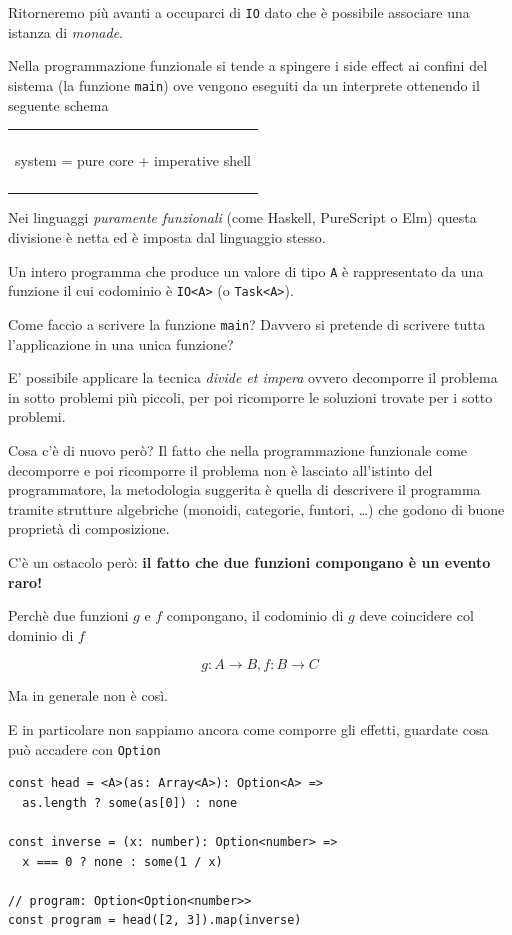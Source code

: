 \documentclass[12pt]{article}
\newenvironment{demo}
    {\begin{center}
    \begin{tabular}{|p{0.9\textwidth}|}
    \hline\\
    }
    {
    \\\\\hline
    \end{tabular}
    \end{center}
    }
\begin{document}
Ritorneremo più avanti a occuparci di \texttt{IO} dato che è possibile associare una istanza di \emph{monade}.

Nella programmazione funzionale si tende a spingere i side effect ai confini del sistema (la funzione \texttt{main})
ove vengono eseguiti da un interprete ottenendo il seguente schema

\begin{demo}
\begin{center}
system = pure core + imperative shell
\end{center}
\end{demo}

Nei linguaggi \emph{puramente funzionali} (come Haskell, PureScript o Elm) questa divisione è netta ed è imposta dal linguaggio stesso.

Un intero programma che produce un valore di tipo \texttt{A} è rappresentato da una funzione il cui codominio è \texttt{IO<A>} (o \texttt{Task<A>}).

Come faccio a scrivere la funzione \texttt{main}? Davvero si pretende di scrivere tutta l'applicazione in una unica funzione?

E' possibile applicare la tecnica \emph{divide et impera} ovvero decomporre il problema in sotto problemi più piccoli,
per poi ricomporre le soluzioni trovate per i sotto problemi.

Cosa c'è di nuovo però? Il fatto che nella programmazione funzionale come decomporre e poi ricomporre il problema non è lasciato
all'istinto del programmatore, la metodologia suggerita è quella di descrivere il programma tramite strutture algebriche
(monoidi, categorie, funtori, \ldots) che godono di buone proprietà di composizione.

C'è un ostacolo però: \textbf{il fatto che due funzioni compongano è un evento raro!}

Perchè due funzioni $g$ e $f$ compongano, il codominio di $g$ deve coincidere col dominio di $f$

$$
g: A \rightarrow B, f: B \rightarrow C
$$

Ma in generale non è così.

E in particolare non sappiamo ancora come comporre gli effetti, guardate cosa può accadere con \texttt{Option}

\begin{verbatim}
const head = <A>(as: Array<A>): Option<A> =>
  as.length ? some(as[0]) : none

const inverse = (x: number): Option<number> =>
  x === 0 ? none : some(1 / x)

// program: Option<Option<number>>
const program = head([2, 3]).map(inverse)
\end{verbatim}
\end{document}
